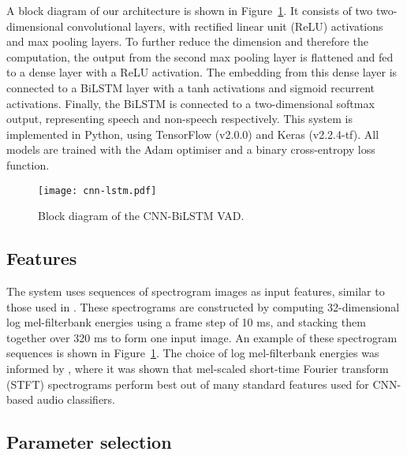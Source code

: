 \documentclass{article}
\begin{document}
A block diagram of our architecture is shown in \mbox{Figure \ref{fig:architecture}}.
It consists of two two-dimensional convolutional layers, with rectified linear unit (ReLU) activations and max pooling layers.
To further reduce the dimension and therefore the computation, the output from the second max pooling layer is flattened and fed to a dense layer with a ReLU activation.
The embedding from this dense layer is connected to a BiLSTM layer with a tanh activations and sigmoid recurrent activations.
Finally, the BiLSTM is connected to a two-dimensional softmax output, representing speech and non-speech respectively.
This system is implemented in Python, using TensorFlow (v2.0.0) and Keras (v2.2.4-tf).
All models are trained with the Adam optimiser \cite{Adam} and a binary cross-entropy loss function.

\begin{figure}\begin{minipage}[b]{1.0\linewidth}
  \centering
  \centerline{\texttt{[image: cnn-lstm.pdf]}}
\end{minipage}
\vspace{-6mm}
\caption{Block diagram of the CNN-BiLSTM VAD.}
\label{fig:architecture}

\end{figure}

\vspace{-2mm}

\subsection{Features}
\label{ssec:feats}

\vspace{-2mm}

The system uses sequences of  spectrogram images as input features, similar to those used in \cite{SmallCNN}.
These spectrograms are constructed by computing 32-dimensional log mel-filterbank energies using a frame step of 10 ms, and stacking them together over 320 ms to form one input image.
An example of these spectrogram sequences is shown in \mbox{Figure \ref{fig:architecture}}.
The choice of log mel-filterbank energies was informed by \cite{features}, where it was shown that mel-scaled short-time Fourier transform (STFT) spectrograms perform best out of many standard features used for CNN-based audio classifiers.

\vspace{-2mm}

\subsection{Parameter selection}
\label{ssec:params}
\end{document}
